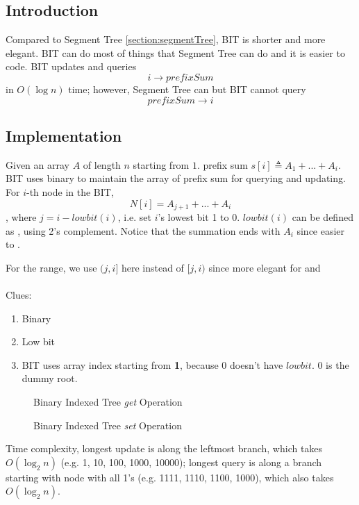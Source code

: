 \subsection{Introduction}
Compared to Segment Tree \ref{section:segmentTree}, BIT is shorter and more elegant. BIT can do most of things that Segment Tree can do and it is easier to code. BIT updates and queries $$i\rightarrow prefixSum$$ in $O(\log n)$ time; however, Segment Tree can but BIT cannot query $$prefixSum \rightarrow i$$
\subsection{Implementation}
Given an array $A$ of length $n $ starting from $1$. prefix sum $s[i]\triangleq A_1+...+A_i$. BIT uses binary to maintain the array of prefix sum for querying and updating. For $i$-th node in the BIT, 
$$
N[i]=A_{j+1}+...+A_i
$$
, where $j=i-lowbit(i)$, i.e. set $i$'s lowest bit 1 to 0. $lowbit(i)$ can be defined as , using 2's complement. Notice that the summation ends with $A_i$ since easier to .

For the range, we use $(j, i]$ here instead of $[j, i)$ since more elegant for  and 
\\\\
Clues:
\begin{enumerate}
\item Binary 
\item Low bit
\item BIT uses array index starting from \textbf{1}, because 0 doesn't have $lowbit$. 0 is the dummy root.
\end{enumerate}
\begin{figure}[hbtp]
\centering
{}
\caption{Binary Indexed Tree \textit{get} Operation}
\label{fig:LABEL}
\end{figure}

\begin{figure}[hbtp]
\centering
{}
\caption{Binary Indexed Tree \textit{set} Operation}
\label{fig:LABEL}
\end{figure}

Time complexity, longest update is along the leftmost branch, which takes $O(\log_2 n)$ (e.g. 1, 10, 100, 1000, 10000); longest query is along a branch starting with node with all 1's (e.g. 1111, 1110, 1100, 1000), which also takes $O(\log_2 n)$.

